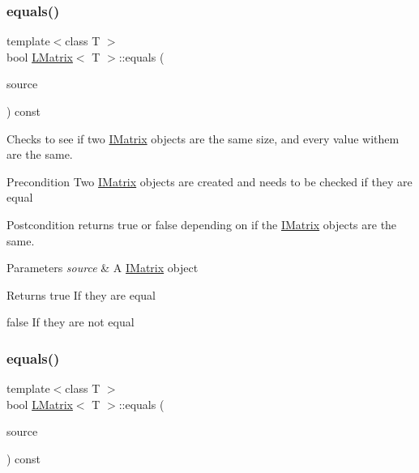 \subsubsection{\texorpdfstring{equals()}{equals()}\hspace{0.1cm}{\footnotesize\ttfamily [2/6]}}
{\footnotesize\ttfamily template$<$class T $>$ \\
bool \mbox{\hyperlink{class_l_matrix}{L\+Matrix}}$<$ T $>$\+::equals (\begin{DoxyParamCaption}\item[{const \mbox{\hyperlink{class_i_matrix}{I\+Matrix}}$<$ \mbox{\hyperlink{class_t_matrix}{T\+Matrix}}$<$ T $>$, T $>$ \&}]{source }\end{DoxyParamCaption}) const}



Checks to see if two \mbox{\hyperlink{class_i_matrix}{I\+Matrix}} objects are the same size, and every value withem are the same. 

\begin{DoxyPrecond}{Precondition}
Two \mbox{\hyperlink{class_i_matrix}{I\+Matrix}} objects are created and needs to be checked if they are equal 
\end{DoxyPrecond}
\begin{DoxyPostcond}{Postcondition}
returns true or false depending on if the \mbox{\hyperlink{class_i_matrix}{I\+Matrix}} objects are the same.
\end{DoxyPostcond}

\begin{DoxyParams}{Parameters}
{\em source} & A \mbox{\hyperlink{class_i_matrix}{I\+Matrix}} object \\
\hline
\end{DoxyParams}
\begin{DoxyReturn}{Returns}
true If they are equal 

false If they are not equal 
\end{DoxyReturn}
\mbox{\label{class_l_matrix_a9b8f4a8601992ef29f01dc29165afb7d}} 
\subsubsection{\texorpdfstring{equals()}{equals()}\hspace{0.1cm}{\footnotesize\ttfamily [3/6]}}
{\footnotesize\ttfamily template$<$class T $>$ \\
bool \mbox{\hyperlink{class_l_matrix}{L\+Matrix}}$<$ T $>$\+::equals (\begin{DoxyParamCaption}\item[{const \mbox{\hyperlink{class_i_matrix}{I\+Matrix}}$<$ \mbox{\hyperlink{class_l_matrix}{L\+Matrix}}$<$ T $>$, T $>$ \&}]{source }\end{DoxyParamCaption}) const\hspace{0.3cm}{\ttfamily [virtual]}}



